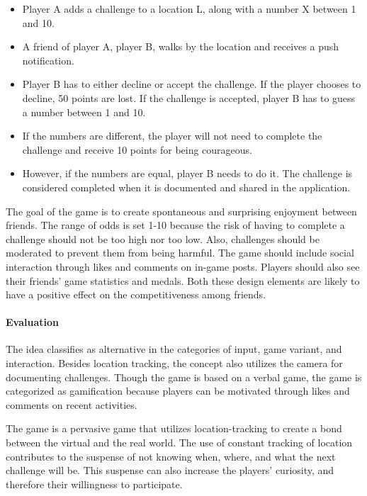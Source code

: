 \begin{itemize}[itemsep=-1ex]
    \item Player A adds a challenge to a location L, along with a number X between 1 and 10.
    \item A friend of player A, player B, walks by the location and receives a push notification.
    \item Player B has to either decline or accept the challenge. If the player chooses to decline, 50 points are lost. If the challenge is accepted, player B has to guess a number between 1 and 10.
    \item If the numbers are different, the player will not need to complete the challenge and receive 10 points for being courageous.
    \item However, if the numbers are equal, player B needs to do it. The challenge is considered completed when it is documented and shared in the application.
\end{itemize}

The goal of the game is to create spontaneous and surprising enjoyment between friends. The range of odds is set 1-10 because the risk of having to complete a challenge should not be too high nor too low. Also, challenges should be moderated to prevent them from being harmful. The game should include social interaction through likes and comments on in-game posts. Players should also see their friends' game statistics and medals. Both these design elements are likely to have a positive effect on the competitiveness among friends.

\paragraph*{Evaluation}
The idea classifies as alternative in the categories of input, game variant, and interaction. Besides location tracking, the concept also utilizes the camera for documenting challenges. Though the game is based on a verbal game, the game is categorized as gamification because players can be motivated through likes and comments on recent activities. 

The game is a pervasive game that utilizes location-tracking to create a bond between the virtual and the real world. The use of constant tracking of location contributes to the suspense of not knowing when, where, and what the next challenge will be. This suspense can also increase the players’ curiosity, and therefore their willingness to participate. 

